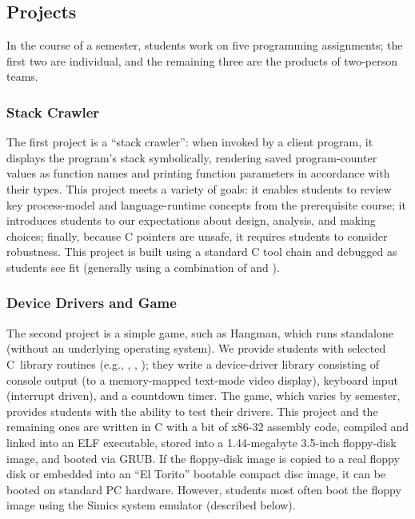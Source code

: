 \subsection{Projects}

In the course of a semester, students work on five
programming assignments; the first two are individual,
and the remaining three are the products of two-person
teams.

\subsubsection{Stack Crawler}
The first project is a ``stack crawler'':  when invoked by
a client program, it displays the program's stack
symbolically, rendering saved program-counter values
as function names and printing function parameters
in accordance with their types.
This project meets a variety of goals:
it enables students to review key process-model and
language-runtime concepts from the
prerequisite course;
it introduces students to our expectations about
design, analysis, and making choices;
finally,
because C pointers are unsafe, it requires students
to consider robustness.
%
This project is built using a standard C tool chain
and debugged as students see fit (generally using
a combination of  and ).

\subsubsection{Device Drivers and Game}
The second project is a simple game, such as Hangman,
which runs standalone (without an underlying
operating system).
We provide students with selected C~library routines
(e.g., , , );
they write a device-driver library consisting of
console output (to a memory-mapped text-mode video display),
keyboard input (interrupt driven),
and a countdown timer.
The game, which varies by semester, provides students
with the ability to test their drivers.
%
%
This project and the remaining ones are written in
C with a bit of x86-32 assembly code,
compiled and linked into an ELF executable,
stored into a 1.44-megabyte 3.5-inch floppy-disk image,
and booted via GRUB.
If the floppy-disk image is copied to a real floppy disk
or embedded into an ``El Torito'' bootable compact disc image,
it can be booted on standard PC hardware.
However, students most often boot the floppy image
using the Simics system emulator (described below).

